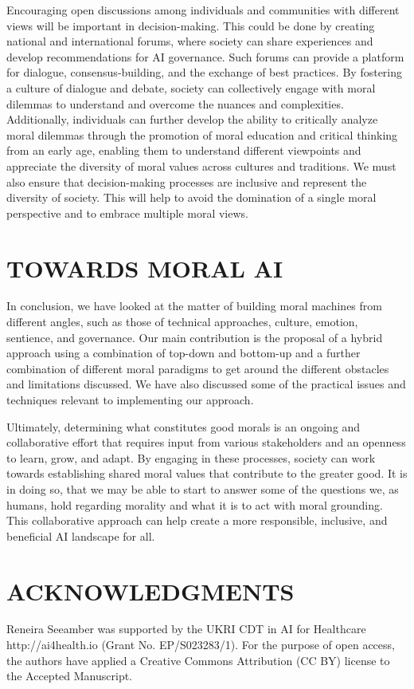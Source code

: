 \documentclass[10pt]{article}
\begin{document}
Encouraging open discussions among individuals and communities with different views will be important in decision-making. This could be done by creating national and international forums, where society can share experiences and develop recommendations for AI governance. Such forums can provide a platform for dialogue, consensus-building, and the exchange of best practices. By fostering a culture of dialogue and debate, society can collectively engage with moral dilemmas to understand and overcome the nuances and complexities. Additionally, individuals can further develop the ability to critically analyze moral dilemmas through the promotion of moral education and critical thinking from an early age, enabling them to understand different viewpoints and appreciate the diversity of moral values across cultures and traditions. We must also ensure that decision-making processes are inclusive and represent the diversity of society. This will help to avoid the domination of a single moral perspective and to embrace multiple moral views.

\section{TOWARDS MORAL AI}

In conclusion, we have looked at the matter of building moral machines from different angles, such as those of technical approaches, culture, emotion, sentience, and governance. Our main contribution is the proposal of a hybrid approach using a combination of top-down and bottom-up and a further combination of different moral paradigms to get around the different obstacles and limitations discussed. We have also discussed some of the practical issues and techniques relevant to implementing our approach. 

Ultimately, determining what constitutes good morals is an ongoing and collaborative effort that requires input from various stakeholders and an openness to learn, grow, and adapt. By engaging in these processes, society can work towards establishing shared moral values that contribute to the greater good. It is in doing so, that we may be able to start to answer some of the questions we, as humans, hold regarding morality and what it is to act with moral grounding. This collaborative approach can help create a more responsible, inclusive, and beneficial AI landscape for all.


\section{ACKNOWLEDGMENTS}
Reneira Seeamber was supported by the UKRI CDT in AI for Healthcare http://ai4health.io (Grant No. EP/S023283/1). For the purpose of open access, the authors have applied a Creative Commons Attribution (CC BY) license to the Accepted Manuscript.
\end{document}
